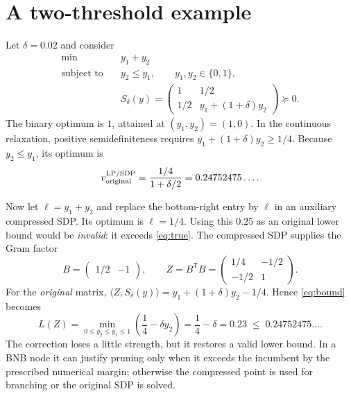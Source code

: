 \documentclass[10pt,a4paper]{article}
\newcommand{\ip}[2]{\langle #1,#2\rangle}
\begin{document}
\clearpage
\section*{A two-threshold example}
Let $\delta=0.02$ and consider
\begin{equation}
 \begin{aligned}
 \min\quad &y_1+y_2\\
 \text{subject to}\quad
 &y_2\leq y_1,\qquad y_1,y_2\in\{0,1\},\\
 &S_\delta(y)=
 \begin{pmatrix}
  1&1/2\\[1pt] 1/2&y_1+(1+\delta)y_2
 \end{pmatrix}\succeq0.
 \end{aligned}                                      \label{eq:example}
\end{equation}
The binary optimum is $1$, attained at $(y_1,y_2)=(1,0)$.  In the
continuous relaxation, positive semidefiniteness requires
$y_1+(1+\delta)y_2\geq1/4$.  Because $y_2\leq y_1$, its optimum is
\begin{equation}
 v_{\rm original}^{\rm LP/SDP}
   =\frac{1/4}{1+\delta/2}
   =0.24752475\ldots .                              \label{eq:true}
\end{equation}

Now let $\ell=y_1+y_2$ and replace the bottom-right entry by $\ell$ in
an auxiliary compressed SDP.  Its optimum is $\ell=1/4$.  Using this
$0.25$ as an original lower bound would be \emph{invalid}: it exceeds
\eqref{eq:true}.  The compressed SDP supplies the Gram factor
\begin{equation}
 B=\begin{pmatrix}1/2&-1\end{pmatrix},\qquad
 Z=B^\mathsf{T}B=
 \begin{pmatrix}1/4&-1/2\\-1/2&1\end{pmatrix}.
\end{equation}
For the \emph{original} matrix,
$\ip{Z}{S_\delta(y)}=y_1+(1+\delta)y_2-1/4$.
Hence \eqref{eq:bound} becomes
\begin{equation}
 L(Z)=\min_{0\leq y_2\leq y_1\leq1}
       \left(\frac14-\delta y_2\right)
     =\frac14-\delta=0.23
     \;\leq\;0.24752475\ldots .
\end{equation}
The correction loses a little strength, but it restores a valid lower
bound.  In a BNB node it can justify pruning only when it exceeds the
incumbent by the prescribed numerical margin; otherwise the compressed
point is used for branching or the original SDP is solved.
\end{document}
